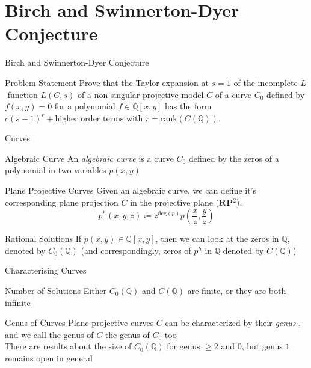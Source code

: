 \documentclass{beamer}
\newcommand{\Rational}{\mathbb{Q}}
\newcommand{\RP}{\mathbf{RP}}
\begin{document}
  \section{Birch and Swinnerton-Dyer Conjecture}
  \begin{frame}{Birch and Swinnerton-Dyer Conjecture}
      \begin{block}{Problem Statement}
          Prove that the Taylor expansion at $s=1$ of the incomplete
          $L$-function $L(C, s)$ of a non-singular projective model $C$ of a
          curve $C_0$ defined by $f(x, y) = 0$ for a polynomial
          $f \in \Rational [x, y]$ has the form
          $c(s-1)^r + \text{higher order terms}$ with
          $r = \mathrm{rank}(C(\Rational))$.
      \end{block}
  \end{frame}
  \begin{frame}{Curves}
      \pause
      \begin{block}{Algebraic Curve}
          An \textit{algebraic curve} is a curve $C_0$ defined by the zeros
          of a polynomial in two variables $p(x, y)$
      \end{block}
      \pause
      \begin{block}{Plane Projective Curves}
          Given an algebraic curve, we can define it's corresponding plane
          projection $C$ in the projective plane ($\RP{} ^2$).
          $$p^h(x, y, z) \coloneqq z^{\mathrm{deg}(p)}p(\frac{x}{z},
          \frac{y}{z})$$
      \end{block}
      \pause
      \begin{block}{Rational Solutions}
          If $p(x, y) \in \Rational\left[x, y\right]$, then we can look at the
          zeros in $\Rational$, denoted by $C_0(\Rational)$ (and
          correspondingly, zeros of $p^h$ in $\Rational$ denoted by
          $C(\Rational)$)
      \end{block}
  \end{frame}
  \begin{frame}{Characterising Curves}
      \pause
      \begin{block}{Number of Solutions}
          Either $C_0(\Rational)$ and $C(\Rational)$ are finite, or they are
          both infinite
      \end{block}
      \pause
      \begin{block}{Genus of Curves}
          Plane projective curves $C$ can be characterized by their
          \textit{genus} , and we call the genus of
          $C$ the genus of $C_0$ too \pause \\
          There are results about the size of $C_0(\Rational)$ for genus $\ge
          2$ and $0$, but genus $1$ remains open in general
      \end{block}
  \end{frame}
\end{document}
